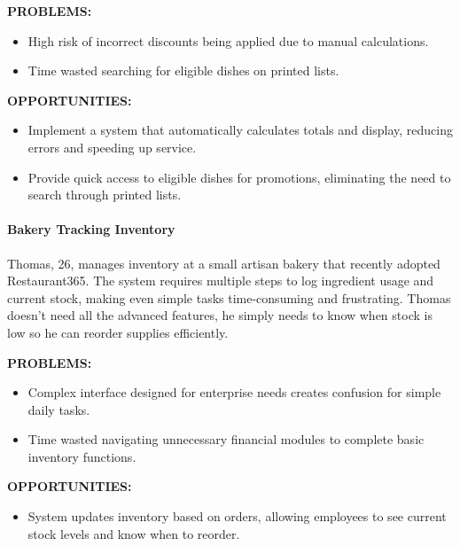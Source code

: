 \documentclass[]{VUMIFTemplateClass}
\newcommand{\suggestioncomment}[1]{%
    \definecolor{lime}{RGB}{50,205,50}%
    \begin{tcolorbox}[colback=lime!15, colframe=lime!60, arc=0pt, outer arc=0pt, boxrule=1pt, left=3pt, right=3pt, top=3pt, bottom=3pt]
        \textbf{\textcolor{lime!70!black}{SUGGESTION:}} #1
    \end{tcolorbox}%
}
\newcommand{\subsubsubsection}[1]{\paragraph{#1}}
\begin{document}
\textbf{PROBLEMS:}

\begin{itemize}
    \item High risk of incorrect discounts being applied due to manual calculations.
    \item Time wasted searching for eligible dishes on printed lists.
\end{itemize}

\textbf{OPPORTUNITIES:}
\begin{itemize}
    \item Implement a system that automatically calculates totals and display, reducing errors and speeding up service.
    \item Provide quick access to eligible dishes for promotions, eliminating the need to search through printed lists.
\end{itemize}




\subsubsubsection{Bakery Tracking Inventory}
\label{subsubsubsec:bakery-inventory}

Thomas, 26, manages inventory at a small artisan bakery that recently adopted Restaurant365. The system requires multiple steps to log ingredient usage and current stock, making even simple tasks time-consuming and frustrating. Thomas doesn’t need all the advanced features, he simply needs to know when stock is low so he can reorder supplies efficiently.

\textbf{PROBLEMS:}
\begin{itemize}
    \item Complex interface designed for enterprise needs creates confusion for simple daily tasks.
    \item Time wasted navigating unnecessary financial modules to complete basic inventory functions.
\end{itemize}

\textbf{OPPORTUNITIES:}
\begin{itemize}
    \item System updates inventory based on orders, allowing employees to see current stock levels and know when to reorder.
\end{itemize}

\end{document}
